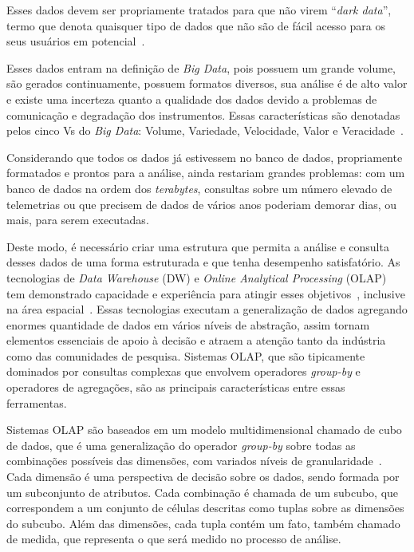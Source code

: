 Esses dados devem ser propriamente tratados para que não virem ``\textit{dark data}'', termo que denota quaisquer tipo de dados que não são de fácil acesso para os seus usuários em potencial~\cite{heidornSheddingLightDark2008}.

Esses dados entram na definição de \textit{Big Data}, pois possuem um grande volume, são gerados continuamente, possuem formatos diversos, sua análise é de alto valor e existe uma incerteza quanto a qualidade dos dados devido a problemas de comunicação e degradação dos instrumentos.
Essas características são denotadas pelos cinco Vs do \textit{Big Data}: Volume, Variedade, Velocidade, Valor e Veracidade~\cite{kacfahemaniUnderstandableBigData2015}.

Considerando que todos os dados já estivessem no banco de dados, propriamente formatados e prontos para a análise, ainda restariam grandes problemas: com um banco de dados na ordem dos \textit{terabytes}, consultas sobre um número elevado de telemetrias ou que precisem de dados de vários anos poderiam demorar dias, ou mais, para serem executadas.

Deste modo, é necessário criar uma estrutura que permita a análise e consulta desses dados de uma forma estruturada e que tenha desempenho satisfatório.
As tecnologias de \textit{Data Warehouse} (DW) e \textit{Online Analytical Processing} (OLAP) tem demonstrado capacidade e experiência para atingir esses objetivos~\cite{bimonteOpenIssuesBig2016}, inclusive na área espacial~\cite{yvernesCopernicusGroundSegment2018}.
Essas tecnologias executam a generalização de dados agregando enormes quantidade de dados em vários níveis de abstração, assim tornam elementos essenciais de apoio à decisão e atraem a atenção tanto da indústria como das comunidades de pesquisa.
Sistemas OLAP, que são tipicamente dominados por consultas complexas que envolvem operadores \textit{group-by} e operadores de agregações, são as principais características entre essas ferramentas.

Sistemas OLAP são baseados em um modelo multidimensional chamado de cubo de dados, que é uma generalização do operador \textit{group-by} sobre todas as combinações possíveis das dimensões, com variados níveis de granularidade~\cite{grayDataCubeRelational1996}.
Cada dimensão é uma perspectiva de decisão sobre os dados, sendo formada por um subconjunto de atributos.
Cada combinação é chamada de um subcubo, que correspondem a um conjunto de células descritas como tuplas sobre as dimensões do subcubo.
Além das dimensões, cada tupla contém um fato, também chamado de medida, que representa o que será medido no processo de análise.

